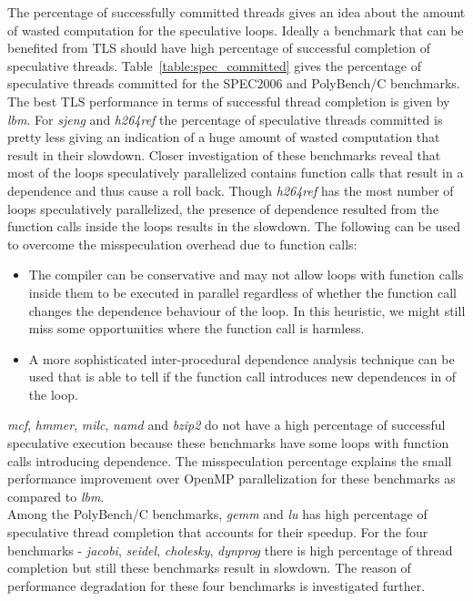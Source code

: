 \documentclass[10pt]{report}          %
\begin{document}
The percentage of successfully committed threads gives an idea about the amount of wasted computation for the speculative loops.  Ideally a benchmark that can be benefited from TLS should have high percentage of successful completion of speculative threads. Table~\ref{table:spec_committed} gives the percentage of speculative threads committed for the SPEC2006 and PolyBench/C benchmarks.  The best TLS performance in terms of successful thread completion is given by \textit{lbm}.  For \textit{sjeng} and \textit{h264ref} the percentage of speculative threads committed is pretty less giving an indication of a huge amount of wasted computation that result in their slowdown.  Closer investigation of these benchmarks reveal that most of the loops speculatively parallelized contains function calls that result in a dependence and thus cause a roll back.  Though \textit{h264ref} has the most number of loops speculatively parallelized, the presence of dependence resulted from the function calls inside the loops results in the slowdown. The following can be used to overcome the misspeculation overhead due to function calls:
\begin{itemize}
\item The compiler can be conservative and may not allow loops with function calls inside them to be executed in parallel regardless of whether the function call changes the dependence behaviour of the loop.  In this heuristic, we might still miss some opportunities where the function call is harmless.
\item A more sophisticated inter-procedural dependence analysis technique can be used that is able to tell if the function call introduces new dependences in of the loop.
\end{itemize}
\textit{mcf}, \textit{hmmer}, \textit{milc}, \textit{namd} and \textit{bzip2} do not have a high percentage of successful speculative execution because these benchmarks have some loops with function calls introducing dependence.  The misspeculation percentage explains the small performance improvement over OpenMP parallelization for these benchmarks as compared to \textit{lbm}.\\
Among the PolyBench/C benchmarks, \textit{gemm} and \textit{lu} has high percentage of speculative thread completion that accounts for their speedup.  For the four benchmarks - \textit{jacobi}, \textit{seidel}, \textit{cholesky}, \textit{dynprog} there is high percentage of thread completion but still these benchmarks result in slowdown.  The reason of performance degradation for these four benchmarks is investigated further.
\end{document}
